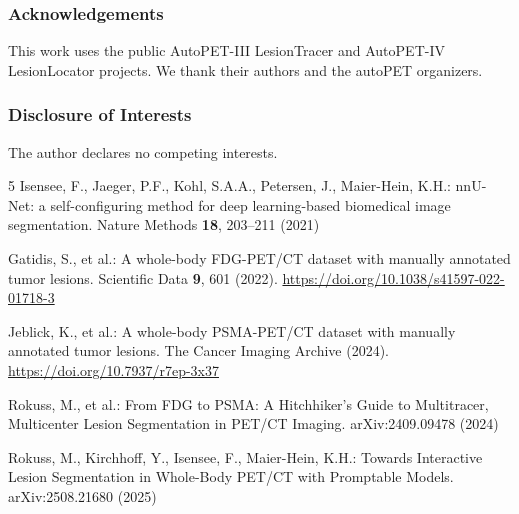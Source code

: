 \documentclass[runningheads]{llncs}
\begin{document}
\begin{credits}
\subsubsection{Acknowledgements}
This work uses the public AutoPET-III LesionTracer and AutoPET-IV LesionLocator
projects. We thank their authors and the autoPET organizers.
\subsubsection{Disclosure of Interests}
The author declares no competing interests.
\end{credits}

\begin{thebibliography}{5}
Isensee, F., Jaeger, P.F., Kohl, S.A.A., Petersen, J., Maier-Hein, K.H.:
nnU-Net: a self-configuring method for deep learning-based biomedical image
segmentation. Nature Methods \textbf{18}, 203--211 (2021)

Gatidis, S., et al.: A whole-body FDG-PET/CT dataset with manually annotated
tumor lesions. Scientific Data \textbf{9}, 601 (2022).
\url{https://doi.org/10.1038/s41597-022-01718-3}

Jeblick, K., et al.: A whole-body PSMA-PET/CT dataset with manually annotated
tumor lesions. The Cancer Imaging Archive (2024).
\url{https://doi.org/10.7937/r7ep-3x37}

Rokuss, M., et al.: From FDG to PSMA: A Hitchhiker's Guide to Multitracer,
Multicenter Lesion Segmentation in PET/CT Imaging. arXiv:2409.09478 (2024)

Rokuss, M., Kirchhoff, Y., Isensee, F., Maier-Hein, K.H.: Towards Interactive
Lesion Segmentation in Whole-Body PET/CT with Promptable Models.
arXiv:2508.21680 (2025)
\end{thebibliography}
\end{document}
